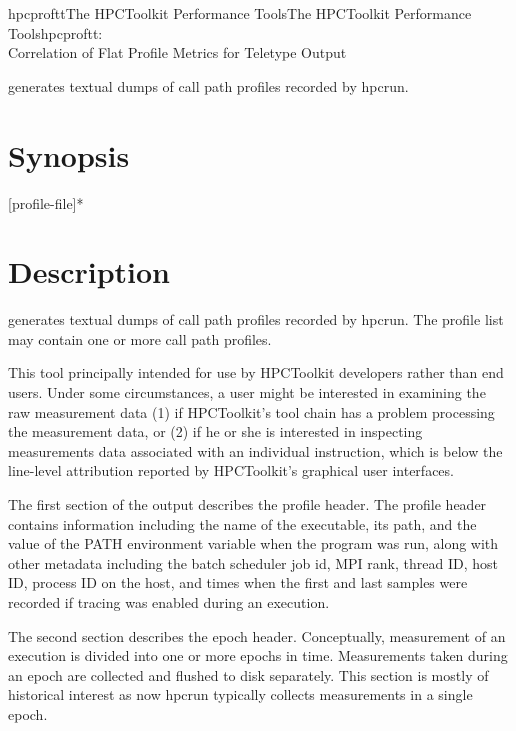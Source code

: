 \documentclass[english]{article}
\begin{document}
\begin{Name}{1}{hpcproftt}{The HPCToolkit Performance Tools}{The HPCToolkit Performance Tools}{hpcproftt:\\ Correlation of Flat Profile Metrics for Teletype Output}


 generates textual dumps of call path profiles recorded by hpcrun.

\end{Name}

\section{Synopsis}

  [profile-file]*


\section{Description}

 generates textual dumps of call path profiles recorded
by hpcrun.  The profile list may contain one or more call path profiles.

This tool principally intended for use by HPCToolkit developers rather
than end users. Under some circumstances, a user might be interested in
examining the raw measurement data (1) if HPCToolkit's tool chain has a problem processing
the measurement data, or (2) if he or she is interested in inspecting
measurements data associated with an individual instruction, which is below the
line-level attribution reported by HPCToolkit's graphical user interfaces.

The first section of the output describes the profile header. The profile
header contains information including the name of the executable, its
path, and the value of the PATH environment variable when the program was
run, along with other metadata including the batch scheduler job id, MPI
rank, thread ID, host ID, process ID on the host, and times when the first
and last samples were recorded if tracing was enabled during an execution.

The second section describes the epoch header. Conceptually, measurement
of an execution is divided into one or more epochs in time. Measurements
taken during an epoch are collected and flushed to disk separately. This
section is mostly of historical interest as now hpcrun typically collects
measurements in a single epoch.
\end{document}
